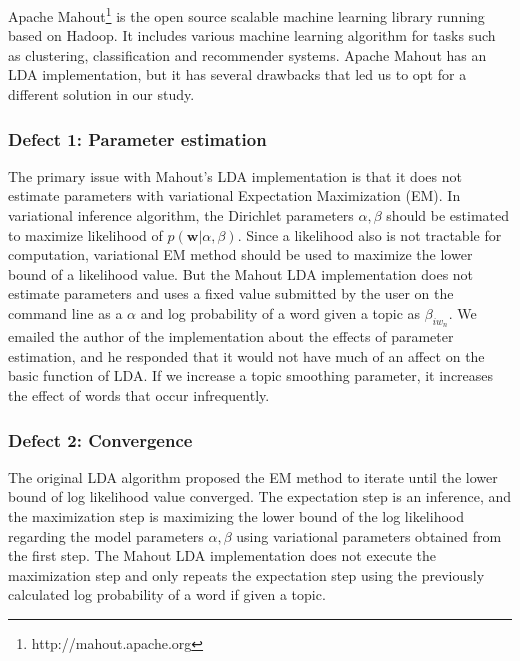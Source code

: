 \documentclass{sig-alternate}
\begin{document}
Apache Mahout\footnote{http://mahout.apache.org} is the open source scalable machine learning library running based on Hadoop. It includes various machine learning algorithm for tasks such as  clustering, classification and recommender systems. Apache Mahout has an LDA implementation, but it has several drawbacks that led us to opt for a different solution in our study.

\subsubsection{Defect 1: Parameter estimation}
The primary issue with Mahout's LDA implementation is that it does not estimate parameters with variational Expectation Maximization (EM). In variational inference algorithm, the Dirichlet parameters $\alpha, \beta$ should be estimated to maximize likelihood of $p(\mathbf{w}|\alpha,\beta)$. Since a likelihood also is not tractable for computation, variational EM method should be used to maximize the lower bound of a likelihood value. But the Mahout LDA implementation does not estimate parameters and uses a fixed value submitted by the user on the command line as a $\alpha$ and log probability of a word given a topic as $\beta_{iw_n}$. We emailed the author of the implementation about the effects of parameter estimation, and he responded that it would not have much of an affect on the basic function of LDA. If we increase a topic smoothing parameter, it increases the effect of words that occur infrequently.

\subsubsection{Defect 2: Convergence}
The original LDA algorithm proposed the EM method to iterate until the lower bound of log likelihood value converged. The expectation step is an inference, and the maximization step is maximizing the lower bound of the log likelihood regarding the model parameters $\alpha, \beta$ using variational parameters obtained from the first step. The Mahout LDA implementation does not execute the maximization step and only repeats the expectation step using the previously calculated log probability of a word if given a topic.
\end{document}
